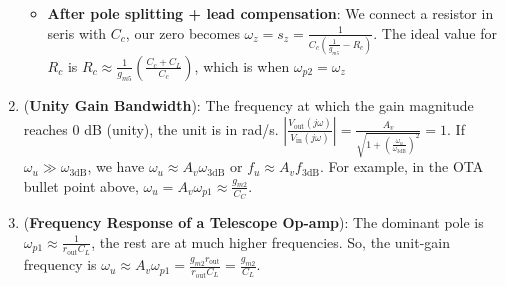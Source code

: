 \documentclass[10pt, landscape]{article}
\begin{document}
\begin{multicols}{4}
\begin{enumerate}
\begin{itemize}
        \item \textbf{After pole splitting + lead compensation}: We connect a resistor in seris with $C_c$, our zero becomes $\omega_z=s_z=\frac{1}{C_c\left(\frac{1}{g_{m5}}-R_c\right)}$. The ideal value for $R_c$ is $R_c\approx\frac{1}{g_{m5}}\left(\frac{C_c+C_L}{C_c}\right)$, which is when $\omega_{p2}=\omega_z$
    \end{itemize}
    \item (\textbf{Unity Gain Bandwidth}): The frequency at which the gain magnitude reaches 0 dB (unity), the unit is in rad/s. $\left|\frac{V_{\text{out}}(j\omega)}{V_{\text{in}}(j\omega)}\right|=\frac{A_v}{\sqrt{1+\left(\frac{\omega_u}{\omega_{3\text{dB}}}\right)^2}}=1$. If $\omega_u\gg\omega_{3\text{dB}}$, we have $\omega_u\approx A_v\omega_{3\text{dB}}\text{ or }f_u\approx A_vf_{3\text{dB}}$. For example, in the OTA bullet point above, $\omega_u=A_v\omega_{p1}\approx\frac{g_{m2}}{C_C}$.
    \item (\textbf{Frequency Response of a Telescope Op-amp}): The dominant pole is $\omega_{p1}\approx\frac{1}{r_{\text{out}}C_L}$, the rest are at much higher frequencies. So, the unit-gain frequency is $\omega_u\approx A_v\omega_{p1} =\frac{g_{m2}r_{\text{out}}}{r_{\text{out}}C_L}=\frac{g_{m2}}{C_L}$.
\end{enumerate}

\end{multicols}

\end{document}
